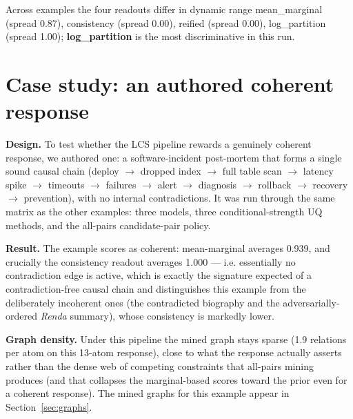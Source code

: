\documentclass[11pt]{article}
\begin{document}
Across examples the four readouts differ in dynamic range mean\_marginal (spread 0.87), consistency (spread 0.00), reified (spread 0.00), log\_partition (spread 1.00); \textbf{log\_partition} is the most discriminative in this run.

\section{Case study: an authored coherent response}

\textbf{Design.} To test whether the LCS pipeline rewards a genuinely coherent response, we authored one: a software-incident post-mortem that forms a single sound causal chain (deploy $\to$ dropped index $\to$ full table scan $\to$ latency spike $\to$ timeouts $\to$ failures $\to$ alert $\to$ diagnosis $\to$ rollback $\to$ recovery $\to$ prevention), with no internal contradictions. It was run through the same matrix as the other examples: three models, three conditional-strength UQ methods, and the all-pairs candidate-pair policy.

\textbf{Result.} The example scores as coherent: mean-marginal averages 0.939, and crucially the consistency readout averages 1.000 --- i.e. essentially no contradiction edge is active, which is exactly the signature expected of a contradiction-free causal chain and distinguishes this example from the deliberately incoherent ones (the contradicted biography and the adversarially-ordered \emph{Renda} summary), whose consistency is markedly lower.

\textbf{Graph density.} Under this pipeline the mined graph stays sparse (1.9 relations per atom on this 13-atom response), close to what the response actually asserts rather than the dense web of competing constraints that all-pairs mining produces (and that collapses the marginal-based scores toward the prior even for a coherent response). The mined graphs for this example appear in Section~\ref{sec:graphs}.
\end{document}

